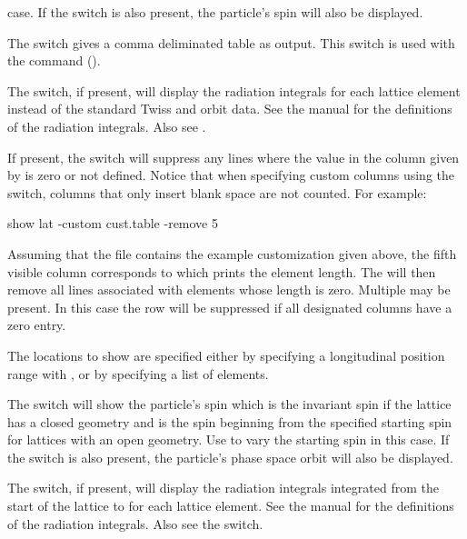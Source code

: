 {{{{{{{{\begin{description}
case. If the  switch is also present, the particle's spin will also be displayed.
%
\item[-python] \Newline
The  switch gives a comma deliminated table as output. This switch is used with the
 command ().
%
\item[-radiation_integrals] \Newline
The  switch, if present, will display the radiation integrals for each
lattice element instead of the standard Twiss and orbit data. See the \bmad manual for the
definitions of the radiation integrals. Also see .
%
\item[-remove_line_if_zero <column \#>] \Newline
If present, the  switch will suppress any lines where the value
in the column given by  is zero or not defined. Notice that when specifying custom
columns using the  switch, columns that only insert blank space are not counted. For
example:
\begin{example}
  show lat -custom cust.table -remove 5
\end{example}
Assuming that the file  contains the example customization given above, the fifth
visible column corresponds to  which prints the element length. The 
will then remove all lines associated with elements whose length is zero. Multiple
 may be present. In this case the row will be suppressed if all designated
columns have a zero entry.
%
\item[-s <s1>:<s2>] \Newline
The locations to show are specified either by specifying a longitudinal position range with ,
or by specifying a list  of elements. 
%
\item[-spin] \Newline
The  switch will show the particle's spin which is the invariant spin if the lattice has a
closed geometry and is the spin beginning from the specified starting spin for lattices with an open
geometry. Use  to vary the starting spin in this case. If the  switch
is also present, the particle's phase space orbit will also be displayed.
%
\item[-sum_radiation_integrals] \Newline
The  switch, if present, will display the radiation integrals
integrated from the start of the lattice to for each lattice element. See the \bmad manual for the
definitions of the radiation integrals. Also see the  switch.

\end{description}}}}}}}}}
